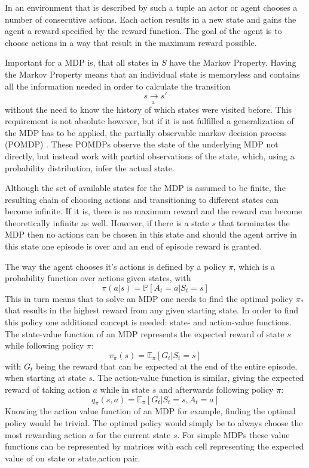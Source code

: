 In an environment that is described by such a tuple an actor or agent chooses a number of consecutive actions. Each action results in a new state and gains the agent a reward specified by the reward function. The goal of the agent is to choose actions in a way that result in the maximum reward possible. 

Important for a MDP is, that all states in $S$ have the Markov Property. Having the Markov Property means that an individual state is memoryless and contains all the information needed in order to calculate the transition
$$s \xrightarrow[\text{a  }]{ } s'$$
without the need to know the history of which states were visited before. This requirement is not absolute however, but if it is not fulfilled a generalization of the MDP has to be applied, the partially observable markov decision process (POMDP) \citep{DBLP:journals/ai/KaelblingLC98,DBLP:journals/ior/SmallwoodS73}. These POMDPs observe the state of the underlying MDP not directly, but instead work with partial observations of the state, which, using a probability distribution, infer the actual state.  

Although the set of available states for the MDP is assumed to be finite, the resulting chain of choosing actions and transitioning to different states can become infinite. If it is, there is no maximum reward and the reward can become theoretically infinite as well. However, if there is a state $s$ that terminates the MDP then no actions can be chosen in this state and should the agent arrive in this state one episode is over and an end of episode reward is granted. 

The way the agent chooses it's actions is defined by a policy $\pi$, which is a probability function over actions given states, with
$$\pi(a|s)=\mathbb{P}[A_t = a | S_t = s]$$
This in turn means that to solve an MDP one needs to find the optimal policy $\pi_*$ that results in the highest reward from any given starting state. In order to find this policy one additional concept is needed: state- and action-value functions.
The state-value function of an MDP represents the expected reward of state $s$ while following policy $\pi$:
$$v_\pi(s) = \mathbb{E}_\pi[G_t | S_t = s ]$$
with $G_t$ being the reward that can be expected at the end of the entire episode, when starting at state $s$.
The action-value function is similar, giving the expected reward of taking action $a$ while in state $s$ and afterwards following policy $\pi$:
$$q_\pi(s, a) = \mathbb{E}_\pi[G_t | S_t = s, A_t = a ]$$
Knowing the action value function of an MDP for example, finding the optimal policy would be trivial. The optimal policy would simply be to always choose the most rewarding action $a$ for the current state $s$.
For simple MDPs these value functions can be represented by matrices with each cell representing the expected value of on state or state,action pair. 

